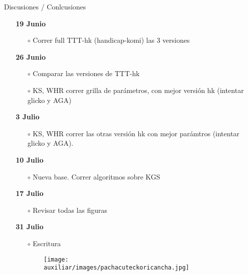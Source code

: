 \documentclass[shownotes,aspectratio=169]{beamer}
\begin{document}
\begin{frame}[plain]
 \centering
 \LARGE Discusiones / Conlcusiones
 
\end{frame}

\begin{frame}[plain]
 
 \begin{itemize}
  \item[\textbf{19 Junio}]
  \begin{itemize}
   \item[$\circ$] Correr full TTT-hk (handicap-komi) las 3 versiones
  \end{itemize}
  
  \item[\textbf{26 Junio}] 
  \begin{itemize}
   \item[$\circ$] Comparar las versiones de TTT-hk
   \item[$\circ$] KS, WHR correr grilla de par\'ametros, con mejor versi\'on hk (intentar glicko y AGA)
  \end{itemize}
  
  \item[\textbf{3 Julio}]
  \begin{itemize}
   \item[$\circ$] KS, WHR correr las otras versi\'on hk con mejor par\'amtros (intentar glicko y AGA).
   \end{itemize}
  
  \item[\textbf{10 Julio}] 
  \begin{itemize}
   \item[$\circ$] Nueva base. Correr algoritmos sobre KGS 
  \end{itemize}
  
  \item[\textbf{17 Julio}] 
  \begin{itemize}
   \item[$\circ$] Revisar todas las figuras 
  \end{itemize}
  
  \item[\textbf{31 Julio}]
  \begin{itemize}
   \item[$\circ$] Escritura
  \end{itemize}
 \end{itemize}
 
\end{frame}


\begin{frame}[plain]
 
 \begin{figure}[H]     
     \centering
     \begin{subfigure}[b]{0.33\textwidth}
       \texttt{[image: auxiliar/images/pachacuteckoricancha.jpg]} 
     \end{subfigure}
   \end{figure} 
  
\end{frame}
\end{document}
